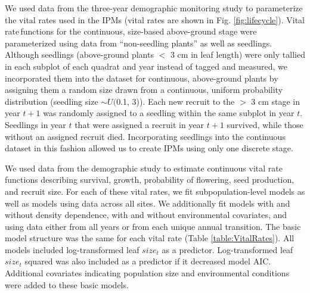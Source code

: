\documentclass[12pt, letterpaper]{article}
\begin{document}
We used data from the three-year demographic monitoring study to parameterize the vital rates used in the IPMs (vital rates are shown in Fig. \ref{fig:lifecycle}). Vital rate functions for the continuous, size-based above-ground stage were parameterized using data from “non-seedling plants” as well as seedlings. Although seedlings (above-ground plants $<$ 3 cm in leaf length) were only tallied in each subplot of each quadrat and year instead of tagged and measured, we incorporated them into the dataset for continuous, above-ground plants by assigning them a random size drawn from a continuous, uniform probability distribution (seedling size $\sim U($0.1, 3)). Each new recruit to the $>$ 3 cm stage in year $t+1$ was randomly assigned to a seedling within the same subplot in year $t$. Seedlings in year $t$ that were assigned a recruit in year $t+1$ survived, while those without an assigned recruit died. Incorporating seedlings into the continuous dataset in this fashion allowed us to create IPMs using only one discrete stage.  

We used data from the demographic study to estimate continuous vital rate functions describing survival, growth, probability of flowering, seed production, and recruit size. For each of these vital rates, we fit subpopulation-level models as well as models using data across all sites. We additionally fit models with and without density dependence, with and without environmental covariates, and using data either from all years or from each unique annual transition. The basic model structure was the same for each vital rate (Table \ref{table:VitalRates}). All models included log-transformed leaf $size_t$ as a predictor. Log-transformed leaf $size_t$ squared was also included as a predictor if it decreased model AIC. Additional covariates indicating population size and environmental conditions were added to these basic models. 
\end{document}
